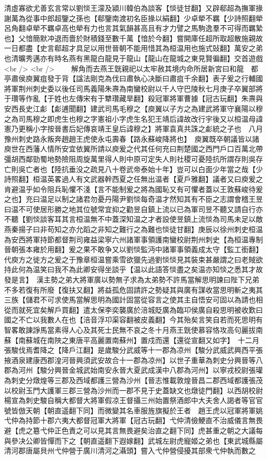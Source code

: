 清虛寡欲尤善玄言常以劉惔王濛及潁川韓伯為談客【惔徒甘翻】又辟郗超為撫軍掾謝萬為從事中郎超鑒之孫也【郗鑒南渡初名臣掾以絹翻】少卓犖不羈【少詩照翻犖呂角翻卓犖不羈卓高也犖有力也言其氣韻甚高且有才力譬之馬駒逸羣不可得而羈縶也】父愔簡默冲退而嗇於財積錢至數千萬【愔於今翻】嘗開庫任超所取超散施親故一日都盡【史言郗超才具足以用世晉朝不能用惜其為桓温用也施式䜴翻】萬安之弟也清曠秀邁亦有時名燕有黑龍白龍見于龍山【龍山在龍城之東見賢徧翻】交首遊戲<br />
<br />
　　解角而去燕王皝親祀以太牢赦其境内命所居新宮曰和龍　都亭肅侯庾翼疽發于背【諡法剛克為伐曰肅執心决斷曰肅疽千余翻】表子爰之行輔國將軍荆州刺史委以後任司馬義陽朱燾為南蠻校尉以千人守巴陵秋七月庚子卒翼部將于瓚等作亂【于姓也左傳宋有于犨瓚藏旱翻】殺冠軍將軍曹據【冠古玩翻】朱燾與安西長史江虨【虨逋聞翻】建武司馬毛穆之【庾翼以子方之為建武將軍守襄陽以穆之為司馬穆之即虎生也穆之字憲祖小字虎生名犯王靖后諱故改行宇後又以桓温母諱憲乃更稱小字按晉書后妃傳哀靖王皇后諱穆之】將軍袁真共誅之虨統之子也　八月豫州刺史路永叛奔趙趙王虎使永屯壽春【路永蘇峻降將也】　庾翼既卒朝議皆以諸庾世在西藩人情所安宜依翼所請以庾爰之代其任何充曰荆楚國之西門戶口百萬北帶彊胡西鄰勁蜀地勢險阻周旋萬里得人則中原可定失人則社稷可憂陸抗所謂存則吳存亡則吳亡者也【陸抗垂没之疏見八十卷武帝泰始十年】豈可以白面少年當之哉【少詩照翻】桓温英畧過人有文武器幹西夏之任無出温者【夏戶雅翻】議者又曰庾爰之肯避温乎如令阻兵恥懼不淺【言不能制爰之將為國恥又有可懼者蓋以王敦蘇峻待爰之也】充曰温足以制之諸君勿憂丹陽尹劉惔每奇温才然知其有不臣之志謂會稽王昱曰温不可使居形勝之地其位號常宜抑之勸昱自鎮上流以已為軍司昱不聽又請自行亦不聽【劉惔談客耳其言桓温無不中蓋深知温之才者設使昱鎮上流惔為司馬未足以敵燕秦揚子曰非苟知之亦允蹈之非知之難行之為難也惔徒甘翻】庚辰以徐州刺史桓温為安西將軍持節都督荆司雍益梁寧六州諸軍事領護南蠻校尉荆州刺史【為桓温專制晉朝張本雍於用翻】爰之果不敢争又以劉惔監沔中諸軍事領義成太守【監工銜翻】代庾方之徙方之爰之于豫章桓温嘗乘雪欲獵先過劉惔惔見其裝束甚嚴謂之曰老賊欲持此何為温笑曰我不為此卿安得坐談乎【温以此語答惔盡之矣温亦知惔之悉其才故發是言】　漢主勢之弟大將軍廣以勢無子求為太弟勢不許馬當解思明諫曰陛下兄弟不多若復有所廢【復扶又翻】將益孤危固請許之勢疑其與廣有謀收當思明斬之夷其三族【儲君不可求使馬當解思明為國計固當從容言之使其主自悟安可固以為請也相從而就死宜矣解戶買翻】遣太保李奕襲廣於涪城貶廣為臨卭侯廣自殺思明被收歎曰國之不亡以我數人在也【涪音浮卭渠容翻被皮義翻】今其殆矣言笑自若而死思明有智畧敢諫諍馬當素得人心及其死士民無不哀之冬十月燕王皝使慕容恪攻高句麗拔南蘇【南蘇城在南陜之東唐平高麗置南蘇州】置戍而還【還從宣翻又如字】　十二月張駿伐焉耆降之【降戶江翻】是歲駿分武威等十一郡為凉州【駿分武威武興西平張掖酒泉建康西郡湟河晉興須武安故合十一郡為凉州】以世子重華為刺史分興晉等八郡為河州【駿分興晉金城武始南安永晉大夏武成漢中八郡為河州】以寧戎校尉張瓘為刺史分燉煌等三郡及西域都護三營為沙州【晉志惟載敦煌晉昌二郡西域都護張茂以校尉玉門大護軍三郡三營為沙州而一郡不見于史蓋缺文也燉徒門翻】以西胡校尉楊宣為刺史駿自稱大都督大將軍假凉王督攝三州始置祭酒郎中大夫舍人謁者等官官號皆倣天朝【朝直遥翻下同】而微變其名車服旌旗擬於王者　趙王虎以冠軍將軍姚弋仲為持節十郡六夷大都督冠軍大將軍【冠古玩翻】弋仲清儉鯁直不治威儀言無畏避【虎之簒弋仲正色責之可以見其言無畏避矣治直之翻下同】虎甚重之朝之大議每與參决公卿皆憚而下之【朝直遥翻下遐嫁翻】武城左尉虎寵姬之弟也【東武城縣屬清河郡唐屬貝州弋仲營于廣川清河之灄頭】嘗入弋仲營侵擾其部衆弋仲執而數之